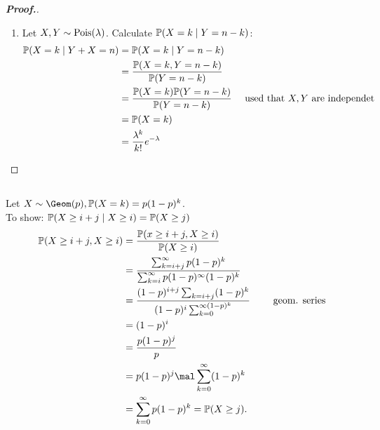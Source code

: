 \begin{proof}[\textbf{Proof.}]
\begin{enumerate}
\begin{proof}[\textbf{Proof.}]
\begin{align*}
				P_j := \set{P \subseteq N \bigcupdot : \abs{P} = k \and \abs{P \cap N} = j\;(\and \abs{P\cap M} = k-j)},
			\end{align*}
			There are $\binom{n}{j}$ many $j$-elements subsets of $N$ and $\binom{m}{k-j}$ many $(k-j)$-elements subsets of $M$. For die cardinality of $P_j$ holds, that $\abs{P_j} = \binom{n}{j} \mal \binom{m}{k-j}$. And the sets $P_0, P_1, \dots, P_k$ pairwise disjoint. With the help of the Sum rule follows
			\begin{align*}
				\binom{n+m}{k} = \sum_{j=0}^k \abs{P_j} = \sum_{j=0}^k \binom{n}{j} \mal \binom{m}{k-j}.
			\end{align*}
		\end{proof}
		\item Let $X,Y \sim \operatorname{Pois}(\lambda)$. Calculate $\mathbb{P}(X=k \mid Y = n -k)$:
		\begin{align*}
			\mathbb{P}(X = k \mid Y + X=n) &= \mathbb{P}(X=k \mid Y=n-k)\\
			&= \frac{\mathbb{P}(X=k, Y = n-k)}{\mathbb{P}(Y = n - k)}\\
			&= \frac{\mathbb{P}(X=k)\mathbb{P}(Y = n-k)}{\mathbb{P}(Y=n-k)} \quad \text{ used that $X,Y$ are independet}\\
			&= \mathbb{P}(X=k)\\
			&= \frac{\lambda^k}{k!} e^{-\lambda}
		\end{align*}
	\end{enumerate}
\end{proof}

\subsection{}
\begin{solution}
	Let $X \sim \Geom(p), \meas(X=k) = p(1-p)^k$.\\
	To show: $\mathbb{P}(X \ge i+j \mid X \ge i) = \mathbb{P}(X \ge j)$
	\begin{align*}
		\meas(X \ge i+j, X\ge i) &= \frac{\meas(x \ge i+j, X \ge i)}{\meas(X \ge i)}\\
		&= \frac{\sum_{k=i+j}^{\infty} p(1-p)^k}{\sum_{k=i}^{\infty} p(1-p)^{\infty} (1-p)^k}\\
		&= \frac{(1-p)^{i+j} \sum_{k=i+j}(1-p)^k}{(1-p)^i \sum_{k=0}^{\infty (1-p)^k}} \qquad \text{ geom. series}\\
		&= (1-p)^i\\
		&= \frac{p(1-p)^j}{p}\\
		&= p(1-p)^j \mal \sum_{k=0}^{\infty} (1-p)^k\\
		&= \sum_{k=0}^{\infty} p(1-p)^k = \meas(X \ge j).
	\end{align*}
\end{solution}
